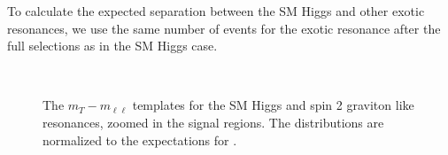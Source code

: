 To calculate the expected separation between the SM Higgs and other 
exotic resonances, we use the same number of events for the exotic resonance
after the full selections as in the SM Higgs case. 

\begin{figure}[!hbtp]
\centering
{}
\\
\caption{The $m_T-m_{\ell\ell}$ templates for the SM Higgs and 
spin 2 graviton like resonances, zoomed in 
the signal regions. The distributions are 
normalized to the expectations for \intlumiEightTeV.}
\label{fig:mtvsmll_sig}
\end{figure}


